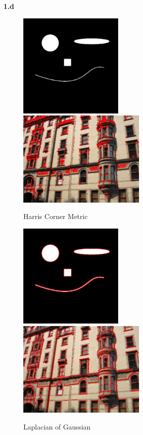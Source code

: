 \documentclass[11pt]{article}
\begin{document}
\newpage
\noindent
\textbf{1.d} \\

\begin{figure}[h]
  \caption{Harris Corner Metric}
    \includegraphics[width=0.45\textwidth]{1d3}
    \includegraphics[width=0.55\textwidth]{1b1}
\end{figure}

\begin{figure}[h]
  \caption{Laplacian of Gaussian}
    \includegraphics[width=0.45\textwidth]{1c}
    \includegraphics[width=0.55\textwidth]{1d2}
\end{figure}
\end{document}
